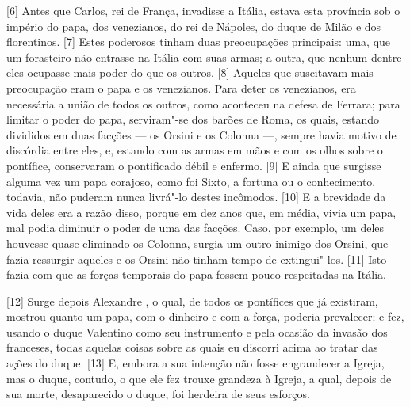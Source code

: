 {[}6{]} Antes que Carlos, rei de França, invadisse a Itália, estava esta província sob o império do papa, dos venezianos,
do rei de Nápoles, do duque de Milão e dos florentinos. {[}7{]} Estes
poderosos tinham duas preocupações principais: uma, que um forasteiro
não entrasse na Itália com suas armas; a outra, que nenhum dentre eles
ocupasse mais poder do que os outros. {[}8{]} Aqueles que suscitavam
mais preocupação eram o papa e os venezianos. Para deter os venezianos,
era necessária a união de todos os outros, como aconteceu na defesa de
Ferrara; para limitar o poder do papa, serviram"-se dos barões de Roma,
os quais, estando divididos em duas facções --- os Orsini e os
Colonna ---, sempre havia motivo de discórdia
entre eles, e, estando com as armas em mãos e com os olhos sobre o
pontífice, conservaram o pontificado débil e enfermo. {[}9{]} E ainda
que surgisse alguma vez um papa corajoso, como foi Sixto, a
fortuna ou o conhecimento, todavia, não puderam nunca livrá"-lo destes
incômodos. {[}10{]} E a brevidade da vida deles era a razão disso,
porque em dez anos que, em média, vivia um papa, mal podia diminuir o
poder de uma das facções. Caso, por exemplo, um deles houvesse quase
eliminado os Colonna, surgia um outro inimigo dos Orsini, que fazia
ressurgir aqueles e os Orsini não tinham tempo de extingui"-los. {[}11{]}
Isto fazia com que as forças temporais do papa fossem pouco respeitadas
na Itália.

{[}12{]} Surge depois Alexandre , o qual, de todos os pontífices que
já existiram, mostrou quanto um papa, com o dinheiro e com a força,
poderia prevalecer; e fez, usando o duque Valentino como seu instrumento
e pela ocasião da invasão dos franceses, todas aquelas coisas sobre as
quais eu discorri acima ao tratar das ações do
duque. {[}13{]} E, embora a sua intenção não fosse engrandecer a Igreja,
mas o duque, contudo, o que ele fez trouxe grandeza à Igreja, a qual,
depois de sua morte, desaparecido o duque, foi herdeira de seus
esforços.

